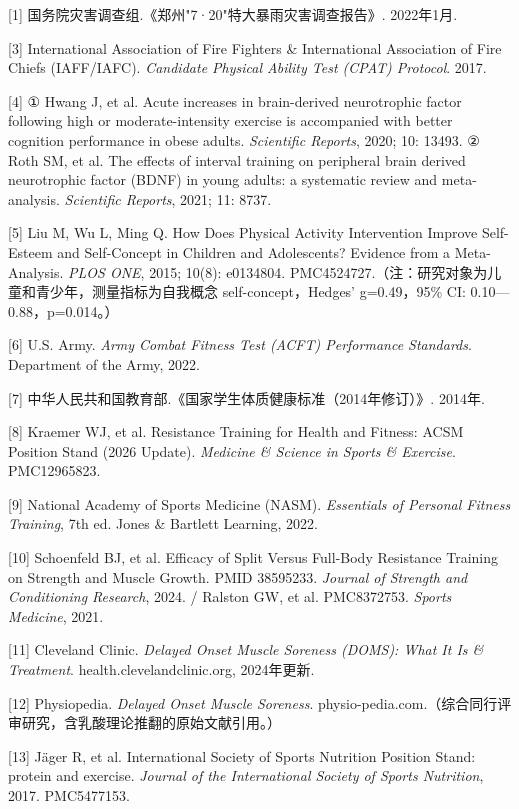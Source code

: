 \documentclass[UTF8,zihao=-4,oneside]{ctexart}
\begin{document}
[1] 国务院灾害调查组.《郑州"7·20"特大暴雨灾害调查报告》. 2022年1月.

[3] International Association of Fire Fighters \& International Association of Fire Chiefs (IAFF/IAFC). \emph{Candidate Physical Ability Test (CPAT) Protocol}. 2017.

[4] ① Hwang J, et al. Acute increases in brain-derived neurotrophic factor following high or moderate-intensity exercise is accompanied with better cognition performance in obese adults. \emph{Scientific Reports}, 2020; 10: 13493. ② Roth SM, et al. The effects of interval training on peripheral brain derived neurotrophic factor (BDNF) in young adults: a systematic review and meta-analysis. \emph{Scientific Reports}, 2021; 11: 8737.

[5] Liu M, Wu L, Ming Q. How Does Physical Activity Intervention Improve Self-Esteem and Self-Concept in Children and Adolescents? Evidence from a Meta-Analysis. \emph{PLOS ONE}, 2015; 10(8): e0134804. PMC4524727.（注：研究对象为儿童和青少年，测量指标为自我概念 self-concept，Hedges' g=0.49，95\% CI: 0.10—0.88，p=0.014。）

[6] U.S. Army. \emph{Army Combat Fitness Test (ACFT) Performance Standards}. Department of the Army, 2022.

[7] 中华人民共和国教育部.《国家学生体质健康标准（2014年修订）》. 2014年.

[8] Kraemer WJ, et al. Resistance Training for Health and Fitness: ACSM Position Stand (2026 Update). \emph{Medicine \& Science in Sports \& Exercise}. PMC12965823.

[9] National Academy of Sports Medicine (NASM). \emph{Essentials of Personal Fitness Training}, 7th ed. Jones \& Bartlett Learning, 2022.

[10] Schoenfeld BJ, et al. Efficacy of Split Versus Full-Body Resistance Training on Strength and Muscle Growth. PMID 38595233. \emph{Journal of Strength and Conditioning Research}, 2024. / Ralston GW, et al. PMC8372753. \emph{Sports Medicine}, 2021.

[11] Cleveland Clinic. \emph{Delayed Onset Muscle Soreness (DOMS): What It Is \& Treatment}. health.clevelandclinic.org, 2024年更新.

[12] Physiopedia. \emph{Delayed Onset Muscle Soreness}. physio-pedia.com.（综合同行评审研究，含乳酸理论推翻的原始文献引用。）

[13] Jäger R, et al. International Society of Sports Nutrition Position Stand: protein and exercise. \emph{Journal of the International Society of Sports Nutrition}, 2017. PMC5477153.
\end{document}
